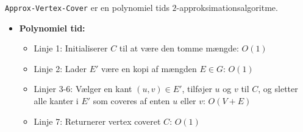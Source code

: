 \begin{frame}[allowframebreaks]
	\begin{theorem}
		\texttt{Approx-Vertex-Cover} er en polynomiel tids $2$-approksimationsalgoritme.
	\end{theorem}
	\begin{itemize}
		\item \textbf{Polynomiel tid:}
		      \begin{itemize}
			      \item Linje 1: Initialiserer $C$ til at være den tomme mængde: $O(1)$
			      \item Linje 2: Lader $E'$ være en kopi af mængden $E \in G$: $O(1)$
			      \item Linjer 3-6: Vælger en kant $(u,v) \in E'$, tilføjer $u$ og $v$ til $C$, og sletter alle kanter i $E'$ som coveres af enten $u$ eller $v$: $O(V+E)$
			      \item Linje 7: Returnerer vertex coveret $C$: $O(1)$
		      \end{itemize}


\end{itemize}
\end{frame}
